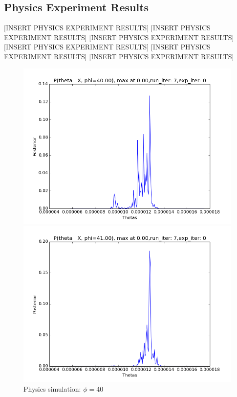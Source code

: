 \documentclass[10pt,journal,compsoc]{IEEEtran}
\begin{document}
\subsection{Physics Experiment Results}
[INSERT PHYSICS EXPERIMENT RESULTS]
[INSERT PHYSICS EXPERIMENT RESULTS]
[INSERT PHYSICS EXPERIMENT RESULTS]
[INSERT PHYSICS EXPERIMENT RESULTS]
[INSERT PHYSICS EXPERIMENT RESULTS]
[INSERT PHYSICS EXPERIMENT RESULTS]
\begin{figure}
\begin{minipage}[b]{0.5\linewidth}
\centering
\includegraphics[width=1\linewidth]{PhysicsPlots/LP0.png} 
\caption{\label{fig:LP0} Physics simulation: $\phi=40$} 
\end{minipage}%
\begin{minipage}[b]{0.5\linewidth}
\centering
\includegraphics[width=1\linewidth]{PhysicsPlots/LP1.png} 

\end{minipage}
\end{figure}
\end{document}
